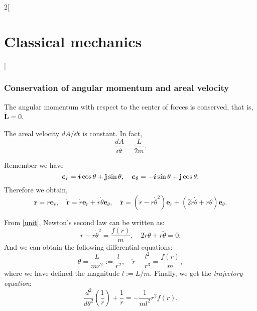 \documentclass[../../../main.tex]{subfiles}
\begin{document}
\begin{multicols}{2}[\section{Classical mechanics}]
    \subsubsection*{Conservation of angular momentum and areal velocity}
    \begin{prop}
        The angular momentum with respect to the center of forces is conserved, that is, $\dot{\boldsymbol{L}}=0$.
    \end{prop}
    \begin{prop}
        The areal velocity $dA/\dd t$ is constant. In fact, $$\frac{dA}{\dd t}=\frac{L}{2m}.$$
    \end{prop}
    \begin{prop}
        Remember we have $$\boldsymbol{e}_r=\boldsymbol{i}\cos\theta+\boldsymbol{\mathrm{j}}\sin\theta,\quad\boldsymbol{e}_\theta=-\boldsymbol{i}\sin\theta+\boldsymbol{\mathrm{j}}\cos\theta.$$ Therefore we obtain,
        \begin{equation}
            \boldsymbol{r}=r\boldsymbol{e}_r,\quad\boldsymbol{\dot{r}}=\dot{r}\boldsymbol{e}_r+r\dot{\theta}\boldsymbol{e}_\theta,\quad\boldsymbol{\ddot{r}}=(\ddot{r}-r\dot{\theta}^2)\boldsymbol{e}_r+(2\dot{r}\dot{\theta}+r\ddot{\theta})\boldsymbol{e}_\theta.
            \label{unit}
        \end{equation}
    \end{prop}
    \begin{prop}
        From \eqref{unit}, Newton's second law can be written as: $$\ddot{r}-r\dot{\theta}^2=\frac{f(r)}{m},\quad 2\dot{r}\dot{\theta}+r\ddot{\theta}=0.$$ And we can obtain the following differential equations: $$\dot{\theta}=\frac{L}{m r^2}:=\frac{l}{r^2},\quad\ddot{r}-\frac{l^2}{r^3}=\frac{f(r)}{m},$$ where we have defined the magnitude $l:=L/m$. Finally, we get the \textit{trajectory equation}: $$\frac{d^2}{d\theta^2}\left(\frac{1}{r}\right)+\frac{1}{r}=-\frac{1}{ml^2}r^2f(r).$$
    \end{prop}

\end{multicols}
\end{document}
